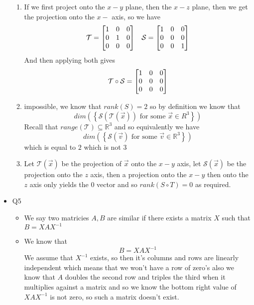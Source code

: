 \documentclass[11pt]{book}
\begin{document}
\begin{itemize}
\begin{enumerate}[label=\alph*)]
            \item If we first project onto the $x-y$ plane, then the $x-z$ plane, then we get the projection onto the $x-$ axis, so we have
                \begin{align*}
                    \mathcal{T} = \mat[b]{ 1 & 0 & 0 \\ 0 & 1 & 0 \\ 0 & 0 & 0 } && \mathcal{S} = \mat[b]{ 1 & 0 & 0 \\ 0 & 0 & 0 \\ 0 & 0 & 1 }
                \end{align*}
            And then applying both gives
            \[
            \mathcal{T}  \circ \mathcal{S} = \mat[b]{ 1 & 0 & 0 \\ 0 & 0 & 0 \\ 0 & 0 & 0 } 
            \]
            \item impossible, we know that $\mathit{rank} \left(S\right) = 2$ so by definition we know that 
                \[
                \mathit{dim} \left(\left\{ \mathcal{S} \left(\mathcal{T} \left(\vec{x} \right) \right) \text{ for some  } \vec{x} \in R^{3}  \right\} \right) 
                \]
                Recall that $\mathit{range} \left(\mathcal{T} \right) \subseteq \mathbb{R} ^{3} $ and so equivalently we have
                \[
                    \mathit{dim} \left(\left\{ \mathcal{S}\left(\vec{v} \right) \text{ for some  } \vec{v} \in \mathbb{R} ^{3}  \right\} \right) 
                \]
                which is equal to $2$ which is not $3$ 
            \item Let $\mathcal{T}\left(\vec{x} \right) $ be the projection of $\vec{x} $ onto the $x-y$ axis, let $\mathcal{S}\left(\vec{x} \right) $ be the projection onto the $z$ axis, then a projection onto the $x-y$ then onto the $z$ axis only yields the 0 vector and so $\mathit{rank} \left(S \circ T \right) = 0$ as required.  
        \end{enumerate}
    \item Q5
        \begin{itemize}
            \item We say two matricies $A, B$ are similar if there exists a matrix $X$ such that $B= XAX^{-1} $ 
            \item We know that 
                \[
                B= XAX^{-1} 
                \]
                We assume that $X^{-1} $ exists, so then it's columns and rows are linearly independent which means that we won't have a row of zero's also we know that $A$ doubles the second row and triples the third when it multiplies against a matrix and so we know the bottom right value of $XAX^{-1} $ is not zero, so such a matrix doesn't exist.
        \end{itemize}
\end{itemize}
\end{document}
